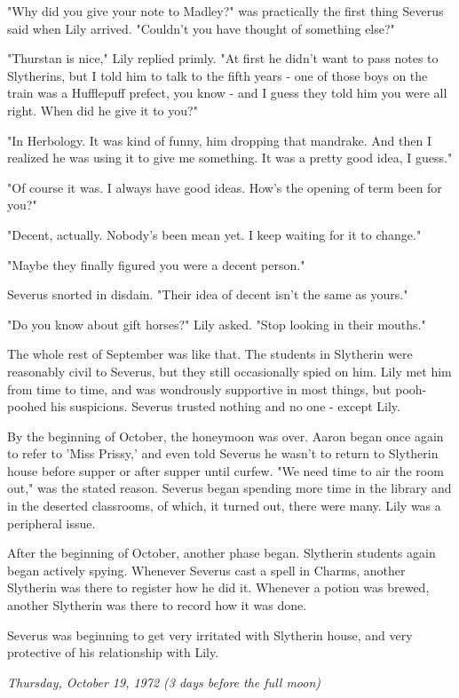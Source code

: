 \documentclass[a4paper,11pt]{article}
\begin{document}
"Why did you give your note to Madley?" was practically the first thing Severus said when Lily arrived. "Couldn't you have thought of something else?"

"Thurstan is nice," Lily replied primly. "At first he didn't want to pass notes to Slytherins, but I told him to talk to the fifth years - one of those boys on the train was a Hufflepuff prefect, you know - and I guess they told him you were all right. When did he give it to you?"

"In Herbology. It was kind of funny, him dropping that mandrake. And then I realized he was using it to give me something. It was a pretty good idea, I guess."

"Of course it was. I always have good ideas. How's the opening of term been for you?"

"Decent, actually. Nobody's been mean yet. I keep waiting for it to change."

"Maybe they finally figured you were a decent person."

Severus snorted in disdain. "Their idea of decent isn't the same as yours."

"Do you know about gift horses?" Lily asked. "Stop looking in their mouths."

The whole rest of September was like that. The students in Slytherin were reasonably civil to Severus, but they still occasionally spied on him. Lily met him from time to time, and was wondrously supportive in most things, but pooh-poohed his suspicions. Severus trusted nothing and no one - except Lily.

By the beginning of October, the honeymoon was over. Aaron began once again to refer to 'Miss Prissy,' and even told Severus he wasn't to return to Slytherin house before supper or after supper until curfew. "We need time to air the room out," was the stated reason. Severus began spending more time in the library and in the deserted classrooms, of which, it turned out, there were many. Lily was a peripheral issue.

After the beginning of October, another phase began. Slytherin students again began actively spying. Whenever Severus cast a spell in Charms, another Slytherin was there to register how he did it. Whenever a potion was brewed, another Slytherin was there to record how it was done.

Severus was beginning to get very irritated with Slytherin house, and very protective of his relationship with Lily.

\emph{Thursday, October 19, 1972 (3 days before the full moon)}
\end{document}
